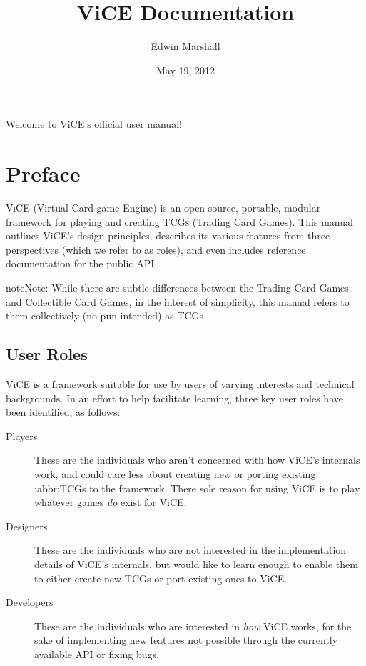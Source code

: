 \documentclass[letterpaper,10pt,english]{sphinxmanual}
\title{ViCE Documentation}
\date{May 19, 2012}
\author{Edwin Marshall}
\begin{document}
\maketitle
\tableofcontents
{}\label{index::doc}


Welcome to ViCE's official user manual!


\part{Preface}
\label{preface::doc}\label{preface:table-of-contents}\label{preface:preface}
\textsc{ViCE} (Virtual Card-game Engine) is an open source, portable, modular
framework for playing and creating \textsc{TCGs} (Trading Card Games). This
manual outlines ViCE's design principles, describes its various features from
three perspectives (which we refer to as roles), and even includes reference
documentation for the public API.

\begin{notice}{note}{Note:}
While there are subtle differences between the Trading Card Games and
Collectible Card Games, in the interest of simplicity, this manual refers
to them collectively (no pun intended) as TCGs.
\end{notice}


\chapter{User Roles}
\label{preface:user-roles}
ViCE is a framework suitable for use by users
of varying interests and technical backgrounds. In an effort to help facilitate
learning, three key user roles have been identified, as follows:
\begin{description}
\item[{Players}] \leavevmode
These are the individuals who aren't concerned with how
ViCE's internals work, and could care less
about creating new or porting existing :abbr:TCGs to
the framework. There sole reason for using
ViCE is to play whatever games \emph{do}
exist for ViCE.

\item[{Designers}] \leavevmode
These are the individuals who are not interested in the
implementation details of ViCE's internals,
but would like to learn enough to enable them to either create new TCGs or
port existing ones to ViCE.

\item[{Developers}] \leavevmode
These are the individuals who are interested in \emph{how}
ViCE works, for the sake of implementing
new features not possible through the currently available API or fixing bugs.

\end{description}
\end{document}
